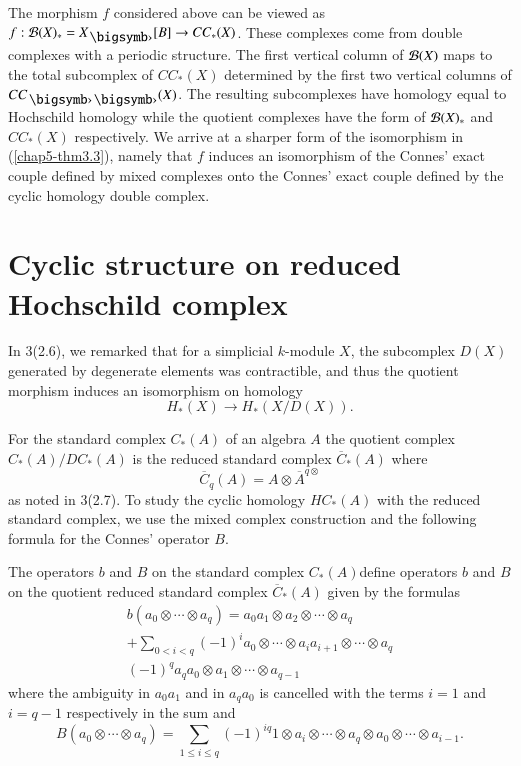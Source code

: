 \begin{remark}\label{chap5-rem3.4}
The morphism $f$ considered above can be viewed as
$f:\B(X)_{\ast}=X_{\bigdot}[B]\to CC_{\ast}(X)$. These complexes come
from double complexes with a periodic structure. The first vertical
column of $\mathcal{B}(X)$ maps to the total subcomplex of $CC_{\ast}(X)$
determined by the first two vertical columns of
$CC_{\bigdot\bigdot}(X)$. The resulting subcomplexes have homology
equal to Hochschild homology while the quotient complexes have the
form of $\mathcal{B}(X)_{\ast}$ and $CC_{\ast}(X)$ respectively. We arrive at a
sharper form of the isomorphism in (\ref{chap5-thm3.3}), namely that
$f$ induces an isomorphism of the Connes' exact couple defined by
mixed complexes onto the Connes' exact couple defined by the cyclic
homology double complex.
\end{remark}

\section{Cyclic structure on reduced Hochschild
  complex}\label{chap5-sec4}

In 3(2.6), we remarked that for a simplicial $k$-module $X$, the
subcomplex $D(X)$ generated by degenerate elements was contractible,
and thus the quotient morphism induces an isomorphism on homology
$$
H_{\ast}(X)\to H_{\ast}(X/D(X)).
$$

For the standard complex $C_{\ast}(A)$ of an algebra $A$ the quotient
complex $C_{\ast}(A)/DC_{\ast}(A)$ is the reduced standard complex
$\overline{C}_{\ast}(A)$ where
$$
\overline{C}_{q}(A)=A\otimes \overline{A}^{q\otimes}
$$
as noted in 3(2.7). To study the cyclic homology $HC_{\ast}(A)$ with
the reduced standard complex, we use the mixed complex construction
and the following formula for the Connes' operator $B$.

\begin{proposition}\label{chap5-prop4.1}
The operators $b$ and $B$ on the standard complex
$C_{\ast}(A)$\pageoriginale define operators $b$ and $B$ on the
quotient reduced standard complex $\overline{C}_{\ast}(A)$ given by
the formulas
\begin{multline*}
b(a_{0}\otimes \cdots\otimes a_{q})=a_{0}a_{1}\otimes
a_{2}\otimes\cdots\otimes a_{q}\\
+\sum_{0<i<q}(-1)^{i}a_{0}\otimes\cdots\otimes
a_{i}a_{i+1}\otimes \cdots\otimes a_{q}\\
(-1)^{q}a_{q}a_{0}\otimes a_{1}\otimes\cdots\otimes a_{q-1}
\end{multline*}
where the ambiguity in $a_{0}a_{1}$ and in $a_{q}a_{0}$ is cancelled
with the terms $i=1$ and $i=q-1$ respectively in the sum and 
$$
B(a_{0}\otimes\cdots\otimes a_{q})=\sum_{1\leq i\leq
  q}(-1)^{iq}1\otimes a_{i}\otimes\cdots\otimes a_{q}\otimes
a_{0}\otimes\cdots\otimes a_{i-1}. 
$$ 
\end{proposition}


